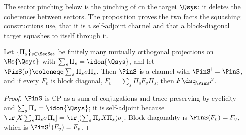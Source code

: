 
The sector pinching below is the pinching of
 on the target $\Qsys$: it deletes the
coherences between sectors. The proposition proves the two facts the
squashing constructions use, that it is a self-adjoint channel and that a
block-diagonal target squashes to itself through it.

\begin{proposition}\label{prop:pinching}
Let $\{\Pi_s\}_{s\in\SecSet}$ be finitely many mutually orthogonal projections
on $\Hs{\Qsys}$ with $\sum_s\Pi_s=\idon{\Qsys}$, and let
$\PinS(\sigma)\coloneqq\sum_s\Pi_s\sigma\Pi_s$. Then $\PinS$ is a channel with
$\PinS^{\dagger}=\PinS$, and if every $F_v$ is block diagonal,
$F_v=\sum_s\Pi_sF_v\Pi_s$, then $F\dsq_{\PinS}F$.
\end{proposition}

\begin{proof}
$\PinS$ is CP as a sum of conjugations and trace preserving by cyclicity and
$\sum_s\Pi_s=\idon{\Qsys}$; it is self-adjoint because
$\tr[X\sum_s\Pi_s\sigma\Pi_s]=\tr[(\sum_s\Pi_sX\Pi_s)\sigma]$. Block
diagonality is $\PinS(F_v)=F_v$, which is
$\PinS^{\dagger}(F_v)=F_v$.
\end{proof}
